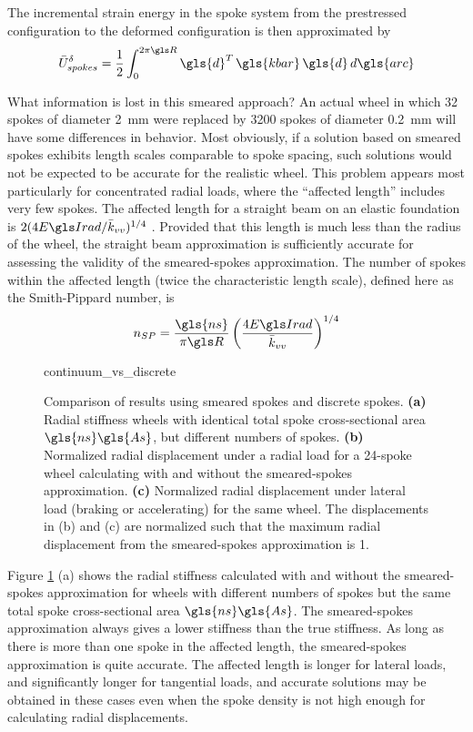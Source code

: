 \documentclass[\rootdir/thesis.tex]{subfiles}
\begin{document}
The incremental strain energy in the spoke system from the prestressed configuration to the deformed configuration is then approximated by
\begin{equation}
\label{eq:dU_spokes_cont}
\bar{U}_{spokes}^{\delta} = \frac{1}{2}\int_0^{2\pi \R} \gls{d}^T\, \gls{kbar}\, \gls{d} \, d\gls{arc}
\end{equation}

What information is lost in this smeared approach? An actual wheel in which 32 spokes of diameter \SI{2}{mm} were replaced by 3200 spokes of diameter \SI{0.2}{mm} will have some differences in behavior. Most obviously, if a solution based on smeared spokes exhibits length scales comparable to spoke spacing, such solutions would not be expected to be accurate for the realistic wheel. This problem appears most particularly for concentrated radial loads, where the ``affected length'' includes very few spokes. The affected length for a straight beam on an elastic foundation is $2(4\EIr/\kvv)^{1/4}$ \cite{Hetenyi1946}. Provided that this length is much less than the radius of the wheel, the straight beam approximation is sufficiently accurate for assessing the validity of the smeared-spokes approximation. The number of spokes within the affected length (twice the characteristic length scale), defined here as the Smith-Pippard number, is
\begin{equation}
n_{SP} = \frac{\gls{ns}}{\pi \R} \left(\frac{4\EIr}{\kvv}\right)^{1/4}
\end{equation}

\begin{figure}[t]
\centering
{continuum_vs_discrete}
\caption[Comparison of smeared-spokes and discrete-spokes calculations]{Comparison of results using smeared spokes and discrete spokes. \textbf{(a)} Radial stiffness wheels with identical total spoke cross-sectional area $\gls{ns}\gls{As}$, but different numbers of spokes. \textbf{(b)} Normalized radial displacement under a radial load for a 24-spoke wheel calculating with and without the smeared-spokes approximation. \textbf{(c)} Normalized radial displacement under lateral load (braking or accelerating) for the same wheel. The displacements in (b) and (c) are normalized such that the maximum radial displacement from the smeared-spokes approximation is 1.}
\label{fig:continuum_vs_discrete}
\end{figure}

Figure \ref{fig:continuum_vs_discrete} (a) shows the radial stiffness calculated with and without the smeared-spokes approximation for wheels with different numbers of spokes but the same total spoke cross-sectional area $\gls{ns}\gls{As}$. The smeared-spokes approximation always gives a lower stiffness than the true stiffness. As long as there is more than one spoke in the affected length, the smeared-spokes approximation is quite accurate. The affected length is longer for lateral loads, and significantly longer for tangential loads, and accurate solutions may be obtained in these cases even when the spoke density is not high enough for calculating radial displacements.
\end{document}
